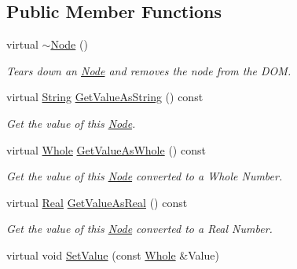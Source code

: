 \subsection*{Public Member Functions}
\begin{DoxyCompactItemize}
\item 
\hypertarget{classphys_1_1xml_1_1Node_a080c89fa36267c587c20f58f73d1b3ac}{
virtual \hyperlink{classphys_1_1xml_1_1Node_a080c89fa36267c587c20f58f73d1b3ac}{$\sim$Node} ()}
\label{d7/d0a/classphys_1_1xml_1_1Node_a080c89fa36267c587c20f58f73d1b3ac}

\begin{DoxyCompactList}\small\item\em Tears down an \hyperlink{classphys_1_1xml_1_1Node}{Node} and removes the node from the DOM. \item\end{DoxyCompactList}\item 
virtual \hyperlink{namespacephys_aa03900411993de7fbfec4789bc1d392e}{String} \hyperlink{classphys_1_1xml_1_1Node_ab3ce1a438c73a9e55625718cd48124b9}{GetValueAsString} () const 
\begin{DoxyCompactList}\small\item\em Get the value of this \hyperlink{classphys_1_1xml_1_1Node}{Node}. \item\end{DoxyCompactList}\item 
virtual \hyperlink{namespacephys_a460f6bc24c8dd347b05e0366ae34f34a}{Whole} \hyperlink{classphys_1_1xml_1_1Node_a2f32a9f3d8b20025f2666407131febb1}{GetValueAsWhole} () const 
\begin{DoxyCompactList}\small\item\em Get the value of this \hyperlink{classphys_1_1xml_1_1Node}{Node} converted to a Whole Number. \item\end{DoxyCompactList}\item 
virtual \hyperlink{namespacephys_af7eb897198d265b8e868f45240230d5f}{Real} \hyperlink{classphys_1_1xml_1_1Node_af8a52240d252613c73bd66a40b01a451}{GetValueAsReal} () const 
\begin{DoxyCompactList}\small\item\em Get the value of this \hyperlink{classphys_1_1xml_1_1Node}{Node} converted to a Real Number. \item\end{DoxyCompactList}\item 
virtual void \hyperlink{classphys_1_1xml_1_1Node_a63f897ea12cc983405ca5418a107a174}{SetValue} (const \hyperlink{namespacephys_a460f6bc24c8dd347b05e0366ae34f34a}{Whole} \&Value)

\end{DoxyCompactItemize}

